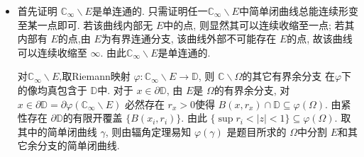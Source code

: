 \begin{itemize}
由$|\varphi_3'(0)|\le 1$得到
$$|f'(0)|\le \frac{2a\log \frac{1}{a}}{1-a^2},$$

等号当且仅当 $\varphi_3(z) = e^{i\theta}z,\ \theta\in \mathbb{R}$时成立, 
代入计算可得到题示等号成立条件.


    \item[1.2.4]
首先证明 $\mathbb{C}_{\infty}\backslash E$是单连通的. 
只需证明任一$\mathbb{C}_{\infty}\backslash E$中简单闭曲线总能连续形变至某一点即可. 
若该曲线内部无 $E$中的点, 则显然其可以连续收缩至一点;
若其内部有 $E$的点,由 $E$为有界连通分支, 该曲线外部不可能存在 $E$的点, 
故该曲线可以连续收缩至 $\infty$. 由此$\mathbb{C}_{\infty}\backslash E$是单连通的.

对$\mathbb{C}_{\infty}\backslash E$,取Riemann映射 
$\varphi:\mathbb{C}_{\infty}\backslash E\to \mathbb{D}$, 
则 $\mathbb{C}\backslash \Omega$的其它有界余分支
在$\varphi$下的像均真包含于 $\mathbb{D}$中. 
对于 $x \in \partial \mathbb{D}$, 由 $E$是 $\Omega$的有界余分支, 
对 $x\in \partial \mathbb{D} = \partial \varphi(\mathbb{C}_{\infty}\backslash E)$
必然存在 $r_{x}>0$使得 $B(x,r_x) \cap \mathbb{D} \subseteq \varphi(\Omega)$. 
由紧性存在 $\partial \mathbb{D}$的有限开覆盖 $\{B(x_i,r_i)\}$. 
由此 $\{\sup r_i <|z|<1\}\subseteq \varphi(\Omega)$. 
取其中的简单闭曲线 $\gamma$, 则由辐角定理易知 $\varphi(\gamma)$
是题目所求的 $\Omega$中分割 $E$和其它余分支的简单闭曲线.
\end{itemize}

